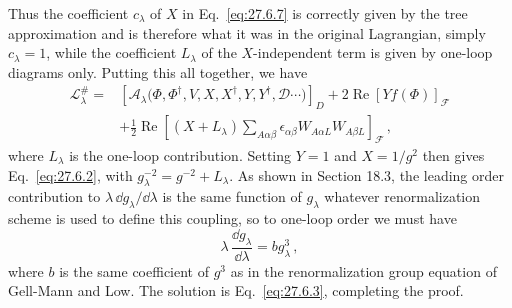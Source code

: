 Thus the coefficient \(c_\lambda\) of \(X\) in Eq.~\eqref{eq:27.6.7} is
correctly given by the tree approximation and is therefore what it was in
the original Lagrangian, simply \(c_\lambda=1\), while the coefficient
\(L_\lambda\) of the \(X\)-independent term is given by one-loop diagrams
only. Putting this all together, we have
\begin{equation}
  \begin{aligned}
  \mathcal{L}^{\#}_\lambda
  ={}&
  \left[
    \mathcal{A}_\lambda
    \bigl(\Phi,\Phi^\dagger,V,X,X^\dagger,Y,Y^\dagger,
    \mathcal{D}\cdots\bigr)
  \right]_D
  +2\operatorname{Re}\left[Yf(\Phi)\right]_{\mathcal{F}}
  \\
  &+\frac12\operatorname{Re}
  \left[
    (X+L_\lambda)
    \sum_{A\alpha\beta}
    \epsilon_{\alpha\beta}W_{A\alpha L}W_{A\beta L}
  \right]_{\mathcal{F}}\,,
  \end{aligned}
  \tag{27.6.13}\label{eq:27.6.13}
\end{equation}
where \(L_\lambda\) is the one-loop contribution. Setting \(Y=1\) and
\(X=1/g^2\) then gives Eq.~\eqref{eq:27.6.2}, with
\(g_\lambda^{-2}=g^{-2}+L_\lambda\). As shown in Section 18.3, the leading
order contribution to \(\lambda\,\dd g_\lambda/\dd\lambda\) is the same function
of \(g_\lambda\) whatever renormalization scheme is used to define this
coupling, so to one-loop order we must have
\begin{equation}
  \lambda\,\frac{\dd g_\lambda}{\dd\lambda}=bg_\lambda^3\,,
  \tag{27.6.14}\label{eq:27.6.14}
\end{equation}
where \(b\) is the same coefficient of \(g^3\) as in the renormalization
group equation of Gell-Mann and Low. The solution is
Eq.~\eqref{eq:27.6.3}, completing the proof.

